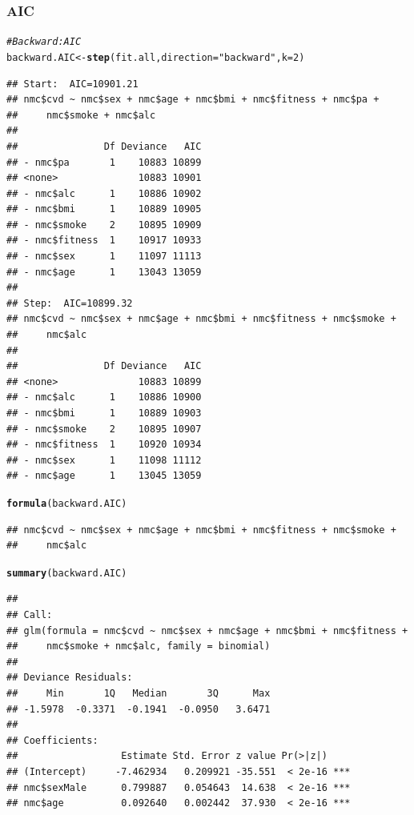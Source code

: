 \documentclass{article}\usepackage[]{graphicx}\usepackage[]{xcolor}
\makeatletter
\newcommand{\hlnum}[1]{\textcolor[rgb]{0.686,0.059,0.569}{#1}}%
\newcommand{\hlstr}[1]{\textcolor[rgb]{0.192,0.494,0.8}{#1}}%
\newcommand{\hlcom}[1]{\textcolor[rgb]{0.678,0.584,0.686}{\textit{#1}}}%
\newcommand{\hlstd}[1]{\textcolor[rgb]{0.345,0.345,0.345}{#1}}%
\newcommand{\hlkwb}[1]{\textcolor[rgb]{0.69,0.353,0.396}{#1}}%
\newcommand{\hlkwc}[1]{\textcolor[rgb]{0.333,0.667,0.333}{#1}}%
\newcommand{\hlkwd}[1]{\textcolor[rgb]{0.737,0.353,0.396}{\textbf{#1}}}%
\newenvironment{kframe}{%
 \def\at@end@of@kframe{}%
 \ifinner\ifhmode%
  \def\at@end@of@kframe{\end{minipage}}%
  \begin{minipage}{\columnwidth}%
 \fi\fi%
 \def\FrameCommand##1{\hskip\@totalleftmargin \hskip-\fboxsep
 \colorbox{shadecolor}{##1}\hskip-\fboxsep
     \hskip-\linewidth \hskip-\@totalleftmargin \hskip\columnwidth}%
 \MakeFramed {\advance\hsize-\width
   \@totalleftmargin\z@ \linewidth\hsize
   \@setminipage}}%
 {\par\unskip\endMakeFramed%
 \at@end@of@kframe}
\newenvironment{knitrout}{}{} %
\makeatother
\begin{document}
        \subsubsection{AIC}
\begin{knitrout}
\color{fgcolor}\begin{kframe}
\begin{alltt}
\hlcom{#Backward: AIC}
\hlstd{backward.AIC} \hlkwb{<-} \hlkwd{step}\hlstd{(fit.all,} \hlkwc{direction}\hlstd{=}\hlstr{"backward"}\hlstd{,} \hlkwc{k}\hlstd{=}\hlnum{2}\hlstd{)}
\end{alltt}
\begin{verbatim}
## Start:  AIC=10901.21
## nmc$cvd ~ nmc$sex + nmc$age + nmc$bmi + nmc$fitness + nmc$pa + 
##     nmc$smoke + nmc$alc
## 
##               Df Deviance   AIC
## - nmc$pa       1    10883 10899
## <none>              10883 10901
## - nmc$alc      1    10886 10902
## - nmc$bmi      1    10889 10905
## - nmc$smoke    2    10895 10909
## - nmc$fitness  1    10917 10933
## - nmc$sex      1    11097 11113
## - nmc$age      1    13043 13059
## 
## Step:  AIC=10899.32
## nmc$cvd ~ nmc$sex + nmc$age + nmc$bmi + nmc$fitness + nmc$smoke + 
##     nmc$alc
## 
##               Df Deviance   AIC
## <none>              10883 10899
## - nmc$alc      1    10886 10900
## - nmc$bmi      1    10889 10903
## - nmc$smoke    2    10895 10907
## - nmc$fitness  1    10920 10934
## - nmc$sex      1    11098 11112
## - nmc$age      1    13045 13059
\end{verbatim}
\begin{alltt}
\hlkwd{formula}\hlstd{(backward.AIC)}
\end{alltt}
\begin{verbatim}
## nmc$cvd ~ nmc$sex + nmc$age + nmc$bmi + nmc$fitness + nmc$smoke + 
##     nmc$alc
\end{verbatim}
\begin{alltt}
\hlkwd{summary}\hlstd{(backward.AIC)}
\end{alltt}
\begin{verbatim}
## 
## Call:
## glm(formula = nmc$cvd ~ nmc$sex + nmc$age + nmc$bmi + nmc$fitness + 
##     nmc$smoke + nmc$alc, family = binomial)
## 
## Deviance Residuals: 
##     Min       1Q   Median       3Q      Max  
## -1.5978  -0.3371  -0.1941  -0.0950   3.6471  
## 
## Coefficients:
##                  Estimate Std. Error z value Pr(>|z|)    
## (Intercept)     -7.462934   0.209921 -35.551  < 2e-16 ***
## nmc$sexMale      0.799887   0.054643  14.638  < 2e-16 ***
## nmc$age          0.092640   0.002442  37.930  < 2e-16 ***

\end{verbatim}
\end{kframe}
\end{knitrout}
\end{document}
